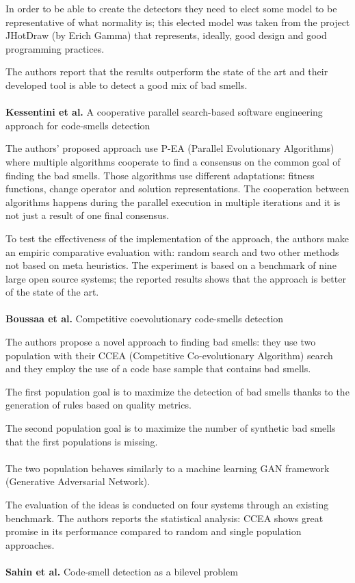 In order to be able to create the detectors they need to elect some model to be representative of what normality is; this elected model was taken from the project JHotDraw (by Erich Gamma) that represents, ideally, good design and good programming practices.

The authors report that the results outperform the state of the art and their developed tool is able to detect a good mix of bad smells.
\\
\\
\textbf{Kessentini et al.} \cite{kessentini2014cooperative} A cooperative parallel search-based software engineering approach for code-smells detection

The authors' proposed approach use P-EA (Parallel Evolutionary Algorithms) where multiple algorithms cooperate to find a consensus on the common goal of finding the bad smells. Those algorithms use different adaptations: fitness functions, change operator and solution representations. The cooperation between algorithms happens during the parallel execution in multiple iterations and it is not just a result of one final consensus.

To test the effectiveness of the implementation of the approach, the authors make an empiric comparative evaluation with: random search and two other methods not based on meta heuristics.
The experiment is based on a benchmark of nine large open source systems; the reported results shows that the approach is better of the state of the art.
\\
\\
\textbf{Boussaa et al.} \cite{boussaa2013competitive} Competitive coevolutionary code-smells detection

The authors propose a novel approach to finding bad smells: they use two population with their CCEA (Competitive Co-evolutionary Algorithm) search and they employ the use of a code base sample that contains bad smells. 

The first population goal is to maximize the detection of bad smells thanks to the generation of rules based on quality metrics. 

The second population goal is to maximize the number of synthetic bad smells that the first populations is missing.
\\
\\
The two population behaves similarly to a machine learning GAN framework (Generative Adversarial Network).

The evaluation of the ideas is conducted on four systems through an existing benchmark. The authors reports the statistical analysis: CCEA shows great promise in its performance compared to random and single population approaches.
\\
\\
\textbf{Sahin et al.} \cite{sahin2014code} Code-smell detection as a bilevel problem

